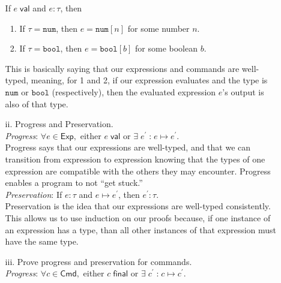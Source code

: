 \documentclass[11pt]{exam}
\newcommand{\fmtkw}[1]{\mathtt{#1}}
\newcommand{\typ}{\ensuremath{\mathit{\tau}}}
\newcommand{\numtyp}{\ensuremath{\fmtkw{num}}}
\newcommand{\booltyp}{\ensuremath{\fmtkw{bool}}}
\newcommand{\Expr}{\ensuremath{\mathsf{Exp}}}
\newcommand{\expr}{\ensuremath{\mathit{e}}}
\newcommand{\numa}[1]{\ensuremath{\fmtkw{num}[#1]}}
\newcommand{\num}{\ensuremath{\mathit{n}}}
\newcommand{\boola}[1]{\ensuremath{\fmtkw{bool}[#1]}}
\newcommand{\bool}{\ensuremath{\mathit{b}}}
\newcommand{\Cmd}{\ensuremath{\mathsf{Cmd}}}
\newcommand{\cmd}{\ensuremath{\mathit{c}}}
\newcommand{\hasType}[2]{\ensuremath{#1 : #2}}
\newcommand{\step}[2]{\ensuremath{#1 \longmapsto #2}}
\newcommand{\isVal}[1]{\ensuremath{#1\;\mathsf{val}}}
\newcommand{\isFinal}[1]{\ensuremath{#1\;\mathsf{final}}}
\begin{document}
\begin{questions}
\begin{itemize}
\begin{itemize}
                If $\expr \isVal{}$ and $\hasType{\expr}{\tau}$, then \\

                \begin{enumerate}
                    \item If $\tau = \numtyp$, then $\expr = \numa{n}$ for some number $\num$.
                    \item If $\tau = \booltyp$, then $\expr = \boola{b}$ for some boolean $\bool$.
                \end{enumerate} 

                This is basically saying that our expressions and commands are well-typed, meaning, for 1 and 2, if our expression evaluates and the type is $\numtyp$ or $\booltyp$ (respectively), then the evaluated expression $\expr$'s output is also of that type.
                \\
                \item[ii.] Progress and Preservation. \\

                \textit{Progress}: $\forall \expr \in \Expr,$ either $\expr \isVal{}$ or $\exists \; \expr^\prime \; \text{:} \; \step{\expr}{\expr^\prime}$. \\
                
                Progress says that our expressions are well-typed, and that we can transition from expression to expression knowing that the types of one expression are compatible with the others they may encounter. Progress enables a program to not ``get stuck.''
                \\
                
                \textit{Preservation}: If $\hasType{\expr}{\typ}$ and $\step{\expr}{\expr^\prime}$, then $\hasType{\expr^\prime}{\typ}$. \\

                Preservation is the idea that our expressions are well-typed consistently. This allows us to use induction on our proofs because, if one instance of an expression has a type, than all other instances of that expression must have the same type. \\

                \item [iii.] Prove progress and preservation for commands. \\

                \textit{Progress}: $\forall \cmd \in \Cmd,$ either $\cmd \isFinal{}$ or $\exists \; \cmd^\prime \; \text{:} \; \step{\cmd}{\cmd^\prime}$. \\


\end{itemize}
\end{itemize}
\end{questions}
\end{document}
